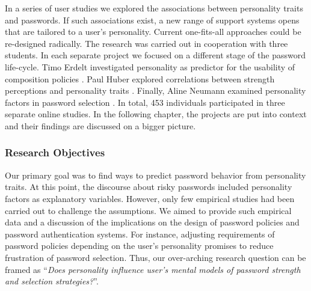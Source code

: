 In a series of user studies we explored the associations between personality traits and passwords. If such associations exist, a new range of support systems opens that are tailored to a user's personality. Current one-fits-all approaches could be re-designed radically. The research was carried out in cooperation with three students. In each separate project we focused on a different stage of the password life-cycle. Timo Erdelt investigated personality as predictor for the usability of composition policies \cite{Erdelt2017BA}. Paul Huber explored correlations between strength perceptions and personality traits \cite{Huber2016BA}. Finally, Aline Neumann examined personality factors in password selection \cite{Neumann2017BA}. In total, 453 individuals participated in three separate online studies. In the following chapter, the projects are put into context and their findings are discussed on a bigger picture. 

\subsubsection*{Research Objectives}
Our primary goal was to find ways to predict password behavior from personality traits. At this point, the discourse about risky passwords included personality factors as explanatory variables. However, only few empirical studies had been carried out to challenge the assumptions. We aimed to provide such empirical data and a discussion of the implications on the design of password policies and password authentication systems. For instance, adjusting requirements of password policies depending on the user's personality promises to reduce frustration of password selection. Thus, our over-arching research question can be framed as ``\textit{Does personality influence user's mental models of password strength and selection strategies?}''.

%
%

